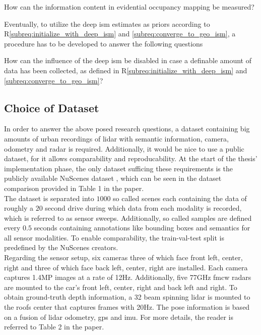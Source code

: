 \begin{requ} \label{requ:how_to_meas_info}
	How can the information content in evidential occupancy mapping be measured?
\end{requ}
Eventually, to utilize the deep \gls{ism} estimates as priors according to R\ref{subreq:initialize_with_deep_ism} and \ref{subreq:converge_to_geo_ism}, a procedure has to be developed to answer the following questions
\begin{requ} \label{requ:disable_deep_ism_influence}
	How can the influence of the deep \gls{ism} be disabled in case a definable amount of data has been collected, as defined in R\ref{subreq:initialize_with_deep_ism} and \ref{subreq:converge_to_geo_ism}?
\end{requ}

%
\subsection{Choice of Dataset}
\label{subsec:choice_of_dataset}
In order to answer the above posed research questions, a dataset containing big amounts of urban recordings of lidar with semantic information, camera, odometry and radar is required. Additionally, it would be nice to use a public dataset, for it allows comparability and reproducability. At the start of the thesis' implementation phase, the only dataset sufficing these requirements is the publicly available NuScenes dataset \cite{caesar2020nuscenes}, which can be seen in the dataset comparison provided in Table 1 in the paper.
\\
The dataset is separated into $1000$ so called scenes each containing the data of roughly a $20$ second drive during which data from each modality is recorded, which is referred to as sensor sweeps. Additionally, so called samples are defined every $0.5$ seconds containing annotations like bounding boxes and semantics for all sensor modalities. To enable comparability, the train-val-test split is predefined by the NuScenes creators.
\\
Regarding the sensor setup, six cameras three of which face front left, center, right and three of which face back left, center, right are installed. Each camera captures 1.4MP images at a rate of 12Hz. Additionally, five 77GHz \gls{fmcw} radars are mounted to the car's front left, center, right and back left and right. To obtain ground-truth depth information, a 32 beam spinning lidar is mounted to the roofs center that captures frames with 20Hz. The pose information is based on a fusion of lidar odometry, \gls{gps} and \gls{imu}.  For more details, the reader is referred to Table 2 in the paper.
%
